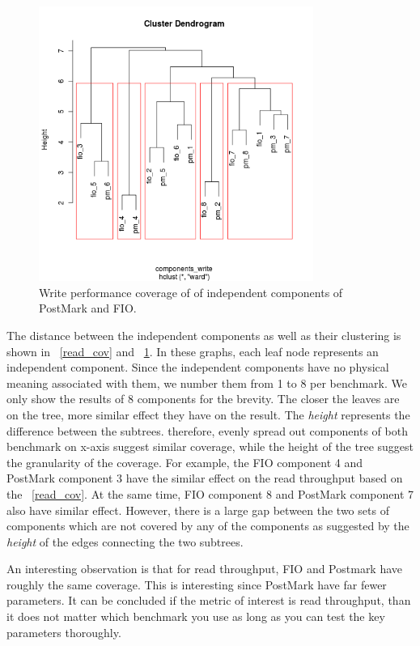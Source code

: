 \begin{figure}[!t]
\centering
\includegraphics[width=0.8\textwidth]{figure/Rplot002.png}
\captionsetup{format=myformat}
\caption{Write performance coverage of of independent components of PostMark and FIO.}
\label{write_cov}
\end{figure}

The distance between the independent components as well as their clustering is shown in \figurename~\ref{read_cov} and \figurename~\ref{write_cov}. 
In these graphs, each leaf node represents an independent component. 
Since the independent components have no physical meaning associated with them, we number them from 1 to 8 per benchmark. 
We only show the results of 8 components for the brevity. The closer the leaves are on the tree, more similar effect they have on the result. The \emph{height} represents the difference between the subtrees. therefore, evenly spread out components of both benchmark on x-axis suggest similar coverage, while the height of the tree suggest the granularity of the coverage. For example, the FIO component 4 and PostMark component 3 have the similar effect on the read throughput based on the \figurename~\ref{read_cov}. At the same time, FIO component 8 and PostMark component 7 also have similar effect. However, there is a large gap between the two sets of components which are not covered by any of the components as suggested by the \emph{height} of the edges connecting the two subtrees.

An interesting observation is that for read throughput, FIO and Postmark have roughly the same coverage. This is interesting since PostMark have far fewer parameters. It can be concluded if the metric of interest is read throughput, than it does not matter which benchmark you use as long as you can test the key parameters thoroughly.


